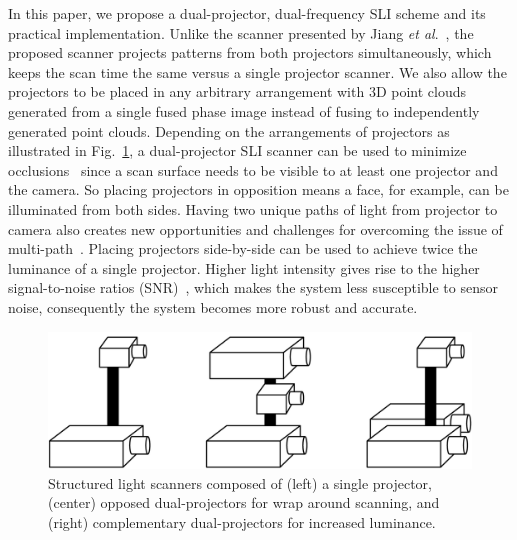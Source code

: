 \documentclass[]{spie}  %
\begin{document}
In this paper, we propose a dual-projector, dual-frequency SLI scheme and its practical implementation. Unlike the scanner presented by Jiang \textit{et al}.~\cite{jian18}, the proposed scanner projects patterns from both projectors simultaneously, which keeps the scan time the same versus a single projector scanner.  We also allow the projectors to be placed in any arbitrary arrangement with 3D point clouds generated from a single fused phase image instead of fusing to independently generated point clouds. Depending on the arrangements of projectors as illustrated in Fig.~\ref{Fig:10}, a dual-projector SLI scanner can be used to minimize occlusions~\cite{linj13} since a scan surface needs to be visible to at least one projector and the camera.  So placing projectors in opposition means a face, for example, can be illuminated from both sides.  Having two unique paths of light from projector to camera also creates new opportunities and challenges for overcoming the issue of multi-path~\cite{otoo16}. Placing projectors side-by-side can be used to achieve twice the luminance of a single projector. Higher light intensity gives rise to the higher signal-to-noise ratios (SNR)~\cite{wangy10}, which makes the system less susceptible to sensor noise, consequently the system becomes more robust and accurate.

\begin{figure}
\centerline{\includegraphics[width=5.0in]{Figures/Layouts}}
\vspace{0.1in}
\caption{Structured light scanners composed of (left) a single projector, (center) opposed dual-projectors for wrap around scanning, and (right) complementary dual-projectors for increased luminance.}
\label{Fig:10}
\end{figure} 
\end{document}
